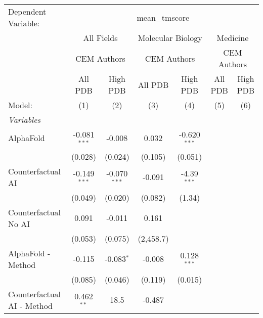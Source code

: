 \begingroup
\centering
\begin{tabular}{lcccccc}
   \tabularnewline \midrule \midrule
   Dependent Variable: & \multicolumn{6}{c}{mean\_tmscore}\\
 & \multicolumn{2}{c}{All Fields} & \multicolumn{2}{c}{Molecular Biology} & \multicolumn{2}{c}{Medicine} \\
\cmidrule(lr){2-3} \cmidrule(lr){4-5} \cmidrule(lr){6-7}
 & \multicolumn{2}{c}{CEM Authors} & \multicolumn{2}{c}{CEM Authors} & \multicolumn{2}{c}{CEM Authors} \\
\cmidrule(lr){2-3} \cmidrule(lr){4-5} \cmidrule(lr){6-7}
 & \multicolumn{1}{c}{All PDB} & \multicolumn{1}{c}{High PDB} & \multicolumn{1}{c}{All PDB} & \multicolumn{1}{c}{High PDB} & \multicolumn{1}{c}{All PDB} & \multicolumn{1}{c}{High PDB} \\
\cmidrule(lr){2-2} \cmidrule(lr){3-3} \cmidrule(lr){4-4} \cmidrule(lr){5-5} \cmidrule(lr){6-6} \cmidrule(lr){7-7}
   Model:                                   & (1)            & (2)            & (3)        & (4)            & (5) & (6)\\  
   \midrule
   \emph{Variables}\\
   AlphaFold                                & -0.081$^{***}$ & -0.008         & 0.032      & -0.620$^{***}$ &     &   \\   
                                            & (0.028)        & (0.024)        & (0.105)    & (0.051)        &     &   \\   
   Counterfactual AI                        & -0.149$^{***}$ & -0.070$^{***}$ & -0.091     & -4.39$^{***}$  &     &   \\   
                                            & (0.049)        & (0.020)        & (0.082)    & (1.34)         &     &   \\   
   Counterfactual No AI                     & 0.091          & -0.011         & 0.161      &                &     &   \\   
                                            & (0.053)        & (0.075)        & (2,458.7)  &                &     &   \\   
   AlphaFold - Method                       & -0.115         & -0.083$^{*}$   & -0.008     & 0.128$^{***}$  &     &   \\   
                                            & (0.085)        & (0.046)        & (0.119)    & (0.015)        &     &   \\   
   Counterfactual AI - Method               & 0.462$^{**}$   & 18.5           & -0.487     &                &     &   \\   

\end{tabular}
